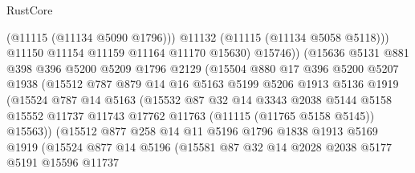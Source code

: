 \begin{lexlean}{RustCore}
\begin{coremodule}
                            (@11115 (@11134 @5090 @1796)))
                          @11132
                          (@11115 (@11134 @5058 @5118)))
                        @11150
                        @11154
                        @11159
                        @11164
                        @11170
                        @15630)
                      @15746))
                  (@15636
                    @5131
                    @881
                    @398
                    @396
                    @5200
                    @5209
                    @1796
                    @2129
                    (@15504
                      @880
                      @17
                      @396
                      @5200
                      @5207
                      @1938
                      (@15512
                        @787
                        @879
                        @14
                        @16
                        @5163
                        @5199
                        @5206
                        @1913
                        @5136
                        @1919
                        (@15524
                          @787
                          @14
                          @5163
                          (@15532
                            @87
                            @32
                            @14
                            @3343
                            @2038
                            @5144
                            @5158
                            @15552
                            @11737
                            @11743
                            @17762
                            @11763
                            (@11115 (@11765 @5158 @5145))
                            @15563))
                        (@15512
                          @877
                          @258
                          @14
                          @11
                          @5196
                          @1796
                          @1838
                          @1913
                          @5169
                          @1919
                          (@15524
                            @877
                            @14
                            @5196
                            (@15581
                              @87
                              @32
                              @14
                              @2028
                              @2038
                              @5177
                              @5191
                              @15596
                              @11737

\end{coremodule}
\end{lexlean}

